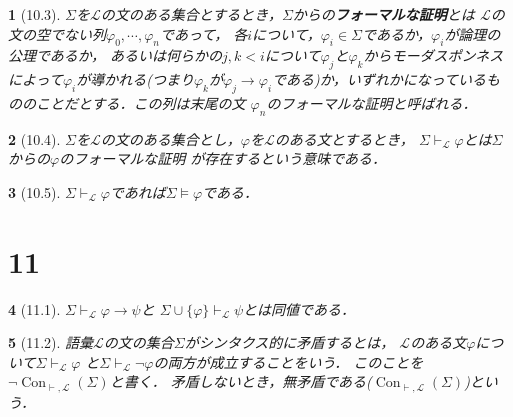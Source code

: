 \documentclass[a4j,10.5pt,oneside,openany]{jsbook}
\theoremstyle{mystyle}
\newtheorem{thm}{\color{DarkMidnightBlue}{定理}}[section]
\newtheorem{dfn}[thm]{\color{PakistanGreen}{定義}}
\newcommand{\Con}{\operatorname{Con}} %
\begin{document}
	\begin{screen}
		\begin{dfn}[10.3]
			$\Sigma$を$\mathcal{L}$の文のある集合とするとき，$\Sigma$からの{\bf フォーマルな証明}とは
			$\mathcal{L}$の文の空でない列$\varphi_{0},\cdots,\varphi_{n}$であって，
			各$i$について，$\varphi_{i} \in \Sigma$であるか，$\varphi_{i}$が論理の公理であるか，
			あるいは何らかの$j,k < i$について$\varphi_{j}$と$\varphi_{k}$からモーダスポンネス
			によって$\varphi_{i}$が導かれる(つまり$\varphi_{k}$が$\varphi_{j} \rightarrow
			\varphi_{i}$である)か，いずれかになっているもののことだとする．この列は末尾の文
			$\varphi_{n}$のフォーマルな証明と呼ばれる．
		\end{dfn}
	\end{screen}
	
	\begin{screen}
		\begin{dfn}[10.4]
			$\Sigma$を$\mathcal{L}$の文のある集合とし，$\varphi$を$\mathcal{L}$のある文とするとき，
			$\Sigma \vdash_{\mathcal{L}} \varphi$とは$\Sigma$からの$\varphi$のフォーマルな証明
			が存在するという意味である．
		\end{dfn}
	\end{screen}
	
	\begin{screen}
		\begin{thm}[10.5]
			$\Sigma \vdash_{\mathcal{L}} \varphi$であれば$\Sigma \models \varphi$である．
		\end{thm}
	\end{screen}

\section{11}
	\begin{screen}
		\begin{thm}[11.1]
			$\Sigma \vdash_{\mathcal{L}} \varphi \rightarrow \psi$と
			$\Sigma \cup \{\varphi\} \vdash_{\mathcal{L}} \psi$とは同値である．
		\end{thm}
	\end{screen}
	
	\begin{screen}
		\begin{dfn}[11.2]
			語彙$\mathcal{L}$の文の集合$\Sigma$がシンタクス的に矛盾するとは，
			$\mathcal{L}$のある文$\varphi$について$\Sigma \vdash_{\mathcal{L}} \varphi$
			と$\Sigma \vdash_{\mathcal{L}} \neg \varphi$の両方が成立することをいう．
			このことを$\neg \Con_{\vdash,\mathcal{L}}(\Sigma)$と書く．
			矛盾しないとき，無矛盾である($\Con_{\vdash,\mathcal{L}}(\Sigma)$)という．
		\end{dfn}
	\end{screen}
	
\end{document}
